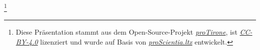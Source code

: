%
\footnote{\tiny{Diese Präsentation stammt aus dem Open-Source-Projekt
\textit{\href{https://github.com/protirone/protico.ltx}{proTirone}},
ist \textit{\href{https://creativecommons.org/licenses/by/4.0/}{CC-BY-4.0}} lizenziert 
und wurde auf Basis von \textit{\href{https://github.com/kreincke/proScientia.ltx}{proScientia.ltx}} 
entwickelt.}}

